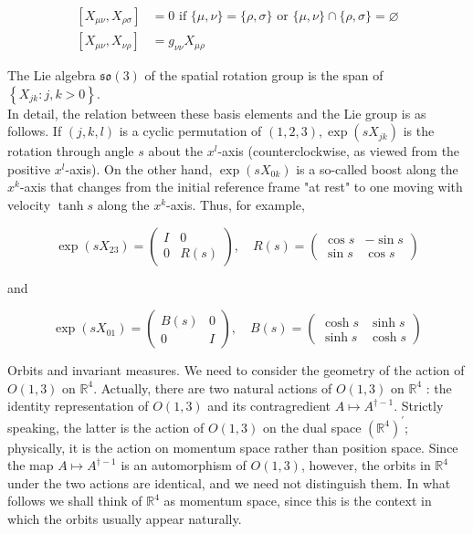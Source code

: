 \documentclass[10pt, letterpaper]{article}
\begin{document}
$$
\begin{aligned}
{\left[X_{\mu \nu}, X_{\rho \sigma}\right] } & =0 \text { if }\{\mu, \nu\}=\{\rho, \sigma\} \text { or }\{\mu, \nu\} \cap\{\rho, \sigma\}=\varnothing \\
{\left[X_{\mu \nu}, X_{\nu \rho}\right] } & =g_{\nu \nu} X_{\mu \rho}
\end{aligned}
$$

The Lie algebra $\mathfrak{s} \mathfrak{o}(3)$ of the spatial rotation group is the span of $\left\{X_{j k}: j, k>0\right\}$.\\
In detail, the relation between these basis elements and the Lie group is as follows. If $(j, k, l)$ is a cyclic permutation of $(1,2,3), \exp \left(s X_{j k}\right)$ is the rotation through angle $s$ about the $x^{l}$-axis (counterclockwise, as viewed from the positive $x^{l}$-axis). On the other hand, $\exp \left(s X_{0 k}\right)$ is a so-called boost along the $x^{k}$-axis that changes from the initial reference frame "at rest" to one moving with velocity $\tanh s$ along the $x^{k}$-axis. Thus, for example,

$$
\exp \left(s X_{23}\right)=\left(\begin{array}{cc}
I & 0 \\
0 & R(s)
\end{array}\right), \quad R(s)=\left(\begin{array}{cc}
\cos s & -\sin s \\
\sin s & \cos s
\end{array}\right)
$$

and

$$
\exp \left(s X_{01}\right)=\left(\begin{array}{cc}
B(s) & 0 \\
0 & I
\end{array}\right), \quad B(s)=\left(\begin{array}{cc}
\cosh s & \sinh s \\
\sinh s & \cosh s
\end{array}\right)
$$

Orbits and invariant measures. We need to consider the geometry of the action of $O(1,3)$ on $\mathbb{R}^{4}$. Actually, there are two natural actions of $O(1,3)$ on $\mathbb{R}^{4}$ : the identity representation of $O(1,3)$ and its contragredient $A \mapsto A^{\dagger-1}$. Strictly speaking, the latter is the action of $O(1,3)$ on the dual space $\left(\mathbb{R}^{4}\right)^{\prime}$; physically, it is the action on momentum space rather than position space. Since the map $A \mapsto A^{\dagger-1}$ is an automorphism of $O(1,3)$, however, the orbits in $\mathbb{R}^{4}$ under the two actions are identical, and we need not distinguish them. In what follows we shall think of $\mathbb{R}^{4}$ as momentum space, since this is the context in which the orbits usually appear naturally.
\end{document}
